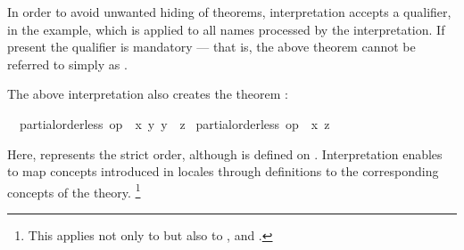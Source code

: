 \begin{isabellebody}
\begin{isamarkuptext}
  In order to avoid unwanted hiding of theorems, interpretation
  accepts a qualifier,  in the example, which is applied to
  all names processed by the
  interpretation.  If present the qualifier is mandatory --- that is,
  the above theorem cannot be referred to simply as .%
\end{isamarkuptext}%
\isamarkuptrue%
%
\isamarkuptrue%
%
\begin{isamarkuptext}%
The above interpretation also creates the theorem
  : \begin{isabelle}%
\ \ {\isasymlbrakk}partial{\isacharunderscore}order{\isachardot}less\ op\ {\isasymle}\ {\isacharquery}x\ {\isacharquery}y{\isacharsemicolon}\ {\isacharquery}y\ {\isasymle}\ {\isacharquery}z{\isasymrbrakk}\isanewline
\isaindent{\ \ }{\isasymLongrightarrow}\ partial{\isacharunderscore}order{\isachardot}less\ op\ {\isasymle}\ {\isacharquery}x\ {\isacharquery}z%
\end{isabelle}
  Here, 
  represents the strict order, although \isa{{\isacharless}} is defined on
  .  Interpretation enables to map concepts
  introduced in locales through definitions to the corresponding
  concepts of the theory.%
\footnote{This applies not only to  but also to
  ,  and .}%
\end{isamarkuptext}%
\isamarkuptrue%
%
\isadelimtheory
%
\endisadelimtheory
%
\isatagtheory
{}\isamarkupfalse%
%
\endisatagtheory
{\isafoldtheory}%
%
\isadelimtheory
%
\endisadelimtheory
\isanewline
\end{isabellebody}%
